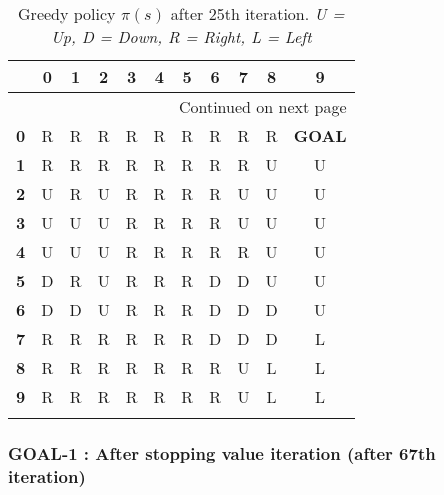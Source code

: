 \documentclass{article}
\begin{document}
\begin{longtable}{|c|c|c|c|c|c|c|c|c|c|c|}
\toprule
{} &  0 &  1 &  2 &  3 &  4 &  5 &  6 &  7 &  8 &  9 \\
\midrule
\endhead
\midrule
\multicolumn{11}{r}{{Continued on next page}} \\
\midrule
\endfoot

\bottomrule
\endlastfoot
\textbf{0} &  R &  R &  R &  R &  R &  R &  R &  R &  R & \textbf{GOAL}  \\\hline
\textbf{1} &  R &  R &  R &  R &  R &  R &  R &  R &  U &  U \\\hline
\textbf{2} &  U &  R &  U &  R &  R &  R &  R &  U &  U &  U \\\hline
\textbf{3} &  U &  U &  U &  R &  R &  R &  R &  U &  U &  U \\\hline
\textbf{4} &  U &  U &  U &  R &  R &  R &  R &  R &  U &  U \\\hline
\textbf{5} &  D &  R &  U &  R &  R &  R &  D &  D &  U &  U \\\hline
\textbf{6} &  D &  D &  U &  R &  R &  R &  D &  D &  D &  U \\\hline
\textbf{7} &  R &  R &  R &  R &  R &  R &  D &  D &  D &  L \\\hline
\textbf{8} &  R &  R &  R &  R &  R &  R &  R &  U &  L &  L \\\hline
\textbf{9} &  R &  R &  R &  R &  R &  R &  R &  U &  L &  L \\\hline
\caption{Greedy policy $\pi(s)$ after 25th iteration. \textit{U = Up, D = Down, R = Right, L = Left}}
\end{longtable}

\subsubsection*{GOAL-1 : After stopping value iteration (after 67th iteration)}
\end{document}

